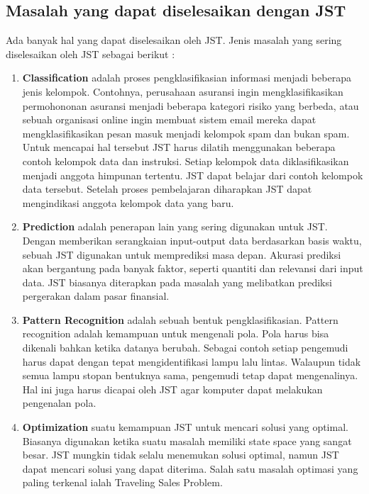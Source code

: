 \subsection{Masalah yang dapat diselesaikan dengan JST}
Ada banyak hal yang dapat diselesaikan oleh JST. Jenis masalah yang sering diselesaikan oleh JST sebagai berikut :
\begin{enumerate}
	\item \textbf{Classification} adalah proses pengklasifikasian informasi menjadi beberapa
jenis kelompok. Contohnya, perusahaan asuransi ingin mengklasifikasikan permohononan asuransi menjadi beberapa kategori risiko yang berbeda, atau sebuah organisasi online ingin membuat sistem email mereka dapat mengklasifikasikan pesan masuk menjadi kelompok spam dan bukan spam. Untuk mencapai hal tersebut JST harus dilatih menggunakan beberapa contoh kelompok data dan instruksi. Setiap kelompok data diklasifikasikan menjadi anggota himpunan tertentu. JST dapat belajar dari contoh kelompok data tersebut. Setelah proses pembelajaran diharapkan JST dapat mengindikasi anggota kelompok data yang baru.
	\item \textbf{Prediction} adalah penerapan lain yang sering digunakan untuk JST. Dengan memberikan serangkaian input-output data berdasarkan basis waktu, sebuah JST
digunakan untuk memprediksi masa depan. Akurasi prediksi akan bergantung pada banyak faktor, seperti quantiti dan relevansi dari input data. JST biasanya diterapkan pada masalah yang melibatkan prediksi pergerakan dalam pasar finansial.
	\item \textbf{Pattern Recognition} adalah sebuah bentuk pengklasifikasian. Pattern recognition adalah kemampuan untuk mengenali pola. Pola harus bisa dikenali bahkan ketika datanya berubah. Sebagai contoh setiap pengemudi harus dapat dengan tepat mengidentifikasi lampu lalu lintas. Walaupun tidak semua lampu stopan bentuknya sama, pengemudi tetap dapat mengenalinya. Hal ini juga harus dicapai oleh JST agar komputer dapat melakukan pengenalan pola.
	\item \textbf{Optimization} suatu kemampuan JST untuk mencari solusi yang optimal. Biasanya digunakan ketika suatu masalah memiliki state space yang sangat besar. JST mungkin tidak selalu menemukan solusi optimal, namun JST dapat mencari solusi yang dapat diterima. Salah satu masalah optimasi yang paling terkenal ialah Traveling Sales Problem.
\end{enumerate}
